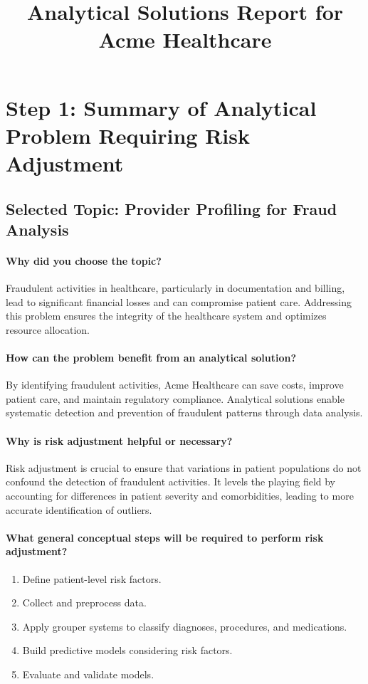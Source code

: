 \documentclass{article}
\title{Analytical Solutions Report for Acme Healthcare}
\author{}
\date{}
\begin{document}
\maketitle

\section*{Step 1: Summary of Analytical Problem Requiring Risk Adjustment}

\subsection*{Selected Topic: Provider Profiling for Fraud Analysis}

\paragraph{Why did you choose the topic?}
Fraudulent activities in healthcare, particularly in documentation and billing, lead to significant financial losses and can compromise patient care. Addressing this problem ensures the integrity of the healthcare system and optimizes resource allocation.

\paragraph{How can the problem benefit from an analytical solution?}
By identifying fraudulent activities, Acme Healthcare can save costs, improve patient care, and maintain regulatory compliance. Analytical solutions enable systematic detection and prevention of fraudulent patterns through data analysis.

\paragraph{Why is risk adjustment helpful or necessary?}
Risk adjustment is crucial to ensure that variations in patient populations do not confound the detection of fraudulent activities. It levels the playing field by accounting for differences in patient severity and comorbidities, leading to more accurate identification of outliers.

\paragraph{What general conceptual steps will be required to perform risk adjustment?}
\begin{enumerate}
    \item Define patient-level risk factors.
    \item Collect and preprocess data.
    \item Apply grouper systems to classify diagnoses, procedures, and medications.
    \item Build predictive models considering risk factors.
    \item Evaluate and validate models.
\end{enumerate}
\end{document}
